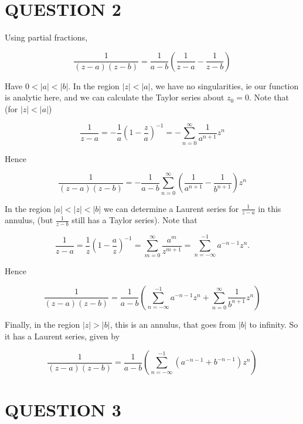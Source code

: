 \documentclass[a4paper]{article}
\begin{document}
\section{QUESTION 2}


Using partial fractions,

\[ \frac{1}{(z-a)(z-b)} = \frac{1}{a-b} \left(   \frac{1}{z-a} - \frac{1}{z - b} \right)  \]


Have $ 0 < | a | < | b | $. In the region $ | z | < | a | $, we have no singularities,  ie our function is analytic here, and we can calculate the  Taylor series about $ z_{0} = 0 $. Note that (for $ | z | < | a | $)

\[ \frac{1}{z - a} = - \frac{1}{a} \left(  1 - \frac{z}{a} \right)^{-1} = - \sum_{n=0}^{\infty} \frac{1}{a^{n+1}} z^{n}  \]


Hence 

\[ \frac{1}{(z-a)(z-b)} = -\frac{1}{a-b} \sum_{n=0}^{\infty} \left(  \frac{1}{a^{n+1}} - \frac{1}{b^{n+1}} \right)  z^{n}   \]




In the region $ | a | < | z | < | b | $ we can determine a Laurent series for $ \frac{1}{z-a} $ in this annulus, (but $ \frac{1}{z-b} $ still has a Taylor series). Note that 

\[
\frac{1}{z - a} = \frac{1}{z} \left(1 - \frac{a}{z}\right)^{-1} = \sum_{m = 0}^\infty \frac{a^m}{z^{m + 1}} = \sum_{n = -\infty}^{-1} a^{-n - 1} z^n.
\]


Hence

\[ \frac{1}{(z-a)(z-b)} = \frac{1}{a-b} \left(  \sum_{n = -\infty}^{-1} a^{-n - 1} z^n + \sum_{n=0}^{\infty} \frac{1}{b^{n+1}} z^{n}   \right)   \]



Finally, in the region $ | z | > | b | $, this is an annulus, that goes from $|b|$ to infinity. So it has a Laurent series, given by



\[ \frac{1}{(z-a)(z-b)} = \frac{1}{a-b} \left(  \sum_{n = -\infty}^{-1} (a^{-n - 1}  + b^{-n-1})z^n  \right)   \]




\section{QUESTION 3}
\end{document}
